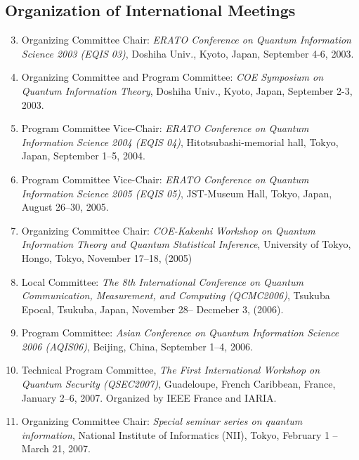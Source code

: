 \subsection{Organization of International Meetings}
\begin{enumerate}
\setcounter{enumi}{2}
\item Organizing Committee Chair:
{\em ERATO Conference on Quantum Information Science 2003 (EQIS 03)}, 
Doshiha Univ., Kyoto, Japan, September 4-6, 2003.

\item Organizing Committee and Program Committee:
{\em COE Symposium on Quantum Information Theory}, 
Doshiha Univ., Kyoto, Japan, September 2-3, 2003.

\item Program Committee Vice-Chair: 
{\em ERATO Conference on Quantum Information Science 2004 (EQIS 04)},
Hitotsubashi-memorial hall, Tokyo, Japan, September 1--5, 2004.

\item Program Committee Vice-Chair: 
{\em ERATO Conference on Quantum Information Science 2005 (EQIS 05)}, 
JST-Museum Hall, Tokyo, Japan, August 26--30, 2005.
\item Organizing Committee Chair: 
{\em COE-Kakenhi Workshop on Quantum Information Theory and Quantum Statistical Inference}, 
University of Tokyo, Hongo, Tokyo,
November 17--18, (2005)
\item Local Committee: 
{\em The 8th International Conference on Quantum Communication, Measurement, and Computing (QCMC2006)}, 
Tsukuba Epocal, Tsukuba, Japan, 
November 28-- Decmeber 3, (2006).
\item Program Committee: 
{\em Asian Conference on Quantum Information Science 2006 (AQIS06)}, 
Beijing, China, September 1--4, 2006.
\item Technical Program Committee, 
{\em The First International Workshop on Quantum Security (QSEC2007)}, 
Guadeloupe, French Caribbean, France, January 2--6, 2007. Organized by IEEE France and IARIA.
\item Organizing Committee Chair: 
{\em Special seminar series on quantum information}, 
National Institute of Informatics (NII), Tokyo, February 1 -- March 21, 2007.


\end{enumerate}
